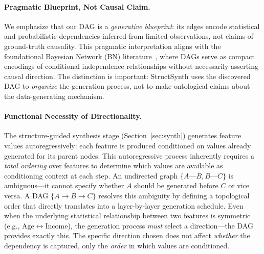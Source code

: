 \paragraph{Pragmatic Blueprint, Not Causal Claim.}
We emphasize that our DAG is a \emph{generative blueprint}: its edges encode statistical and probabilistic dependencies inferred from limited observations, not claims of ground-truth causality. This pragmatic interpretation aligns with the foundational Bayesian Network (BN) literature~\cite{pearl2009causality, koller2009probabilistic}, where DAGs serve as compact encodings of conditional independence relationships without necessarily asserting causal direction. The distinction is important: StructSynth uses the discovered DAG to \emph{organize} the generation process, not to make ontological claims about the data-generating mechanism.

\paragraph{Functional Necessity of Directionality.}
The structure-guided synthesis stage (Section~\ref{sec:synth}) generates feature values autoregressively: each feature is produced conditioned on values already generated for its parent nodes. This autoregressive process inherently requires a \emph{total ordering} over features to determine which values are available as conditioning context at each step. An undirected graph $\{A\text{---}B, B\text{---}C\}$ is ambiguous---it cannot specify whether $A$ should be generated before $C$ or vice versa. A DAG $\{A \to B \to C\}$ resolves this ambiguity by defining a topological order that directly translates into a layer-by-layer generation schedule. Even when the underlying statistical relationship between two features is symmetric (e.g., $\mathrm{Age} \leftrightarrow \mathrm{Income}$), the generation process \emph{must} select a direction---the DAG provides exactly this. The specific direction chosen does not affect \emph{whether} the dependency is captured, only the \emph{order} in which values are conditioned.


